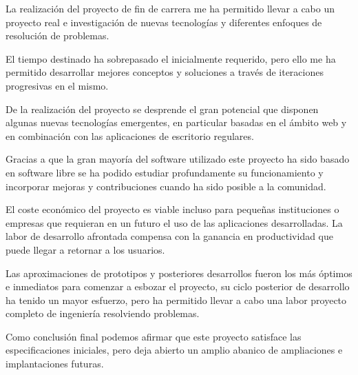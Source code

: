La realización del proyecto de fin de carrera me ha permitido llevar a cabo un
proyecto real e investigación de nuevas tecnologías y diferentes enfoques de
resolución de problemas.

El tiempo destinado ha sobrepasado el inicialmente requerido, pero ello me
ha permitido desarrollar mejores conceptos y soluciones a través de iteraciones
progresivas en el mismo.

De la realización del proyecto se desprende el gran potencial que disponen
algunas nuevas tecnologías emergentes, en particular basadas en el ámbito
web y en combinación con las aplicaciones de escritorio regulares.

Gracias a que la gran mayoría del software
utilizado este proyecto ha sido basado en software libre se ha podido estudiar
profundamente su funcionamiento y incorporar mejoras y contribuciones cuando ha
sido posible a la comunidad.

El coste económico del proyecto es viable incluso para pequeñas instituciones o
empresas que requieran en un futuro el uso de las aplicaciones desarrolladas.
La labor de desarrollo afrontada compensa con la ganancia en productividad que
puede llegar a retornar a los usuarios.

Las aproximaciones de prototipos y posteriores desarrollos fueron los más
óptimos e inmediatos para comenzar a esbozar el proyecto, su ciclo posterior de
desarrollo ha tenido un mayor esfuerzo, pero ha permitido llevar a cabo una labor
proyecto completo de ingeniería resolviendo problemas.

Como conclusión final podemos afirmar que este proyecto satisface las especificaciones 
iniciales, pero deja abierto un amplio abanico de ampliaciones e implantaciones futuras.

\cleardoublepage